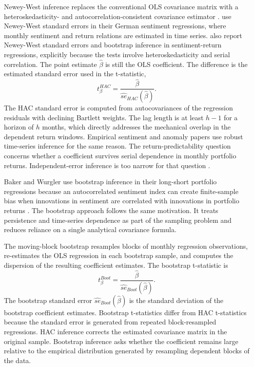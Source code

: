 \documentclass[11pt]{article}
\newcommand{\var}[1]{\ensuremath{#1}}
\begin{document}
Newey-West inference replaces the conventional OLS covariance matrix with a heteroskedasticity- and autocorrelation-consistent covariance estimator \citep{newey1987simple}. \citet{finter2012german} use Newey-West standard errors in their German sentiment regressions, where monthly sentiment and return relations are estimated in time series. \citet{ding2019newtheory} also report Newey-West standard errors and bootstrap inference in sentiment-return regressions, explicitly because the tests involve heteroskedasticity and serial correlation. The point estimate \var{\hat{\beta}} is still the OLS coefficient. The difference is the estimated standard error used in the t-statistic,
\begin{equation}
    t^{HAC}_{\beta}
    =
    \frac{\hat{\beta}}{\widehat{se}_{HAC}(\hat{\beta})}.
\end{equation}
The HAC standard error is computed from autocovariances of the regression residuals with declining Bartlett weights. The lag length is at least \var{h-1} for a horizon of \var{h} months, which directly addresses the mechanical overlap in the dependent return windows. Empirical sentiment and anomaly papers use robust time-series inference for the same reason. The return-predictability question concerns whether a coefficient survives serial dependence in monthly portfolio returns. Independent-error inference is too narrow for that question \citep{stambaugh2012short}.

Baker and Wurgler use bootstrap inference in their long-short portfolio regressions because an autocorrelated sentiment index can create finite-sample bias when innovations in sentiment are correlated with innovations in portfolio returns \citep{baker2006sentiment}. The bootstrap approach follows the same motivation. It treats persistence and time-series dependence as part of the sampling problem and reduces reliance on a single analytical covariance formula.

The moving-block bootstrap resamples blocks of monthly regression observations, re-estimates the OLS regression in each bootstrap sample, and computes the dispersion of the resulting coefficient estimates. The bootstrap t-statistic is
\begin{equation}
    t^{Boot}_{\beta}
    =
    \frac{\hat{\beta}}{\widehat{se}_{Boot}(\hat{\beta})}.
\end{equation}
The bootstrap standard error \var{\widehat{se}_{Boot}(\hat{\beta})} is the standard deviation of the bootstrap coefficient estimates. Bootstrap t-statistics differ from HAC t-statistics because the standard error is generated from repeated block-resampled regressions. HAC inference corrects the estimated covariance matrix in the original sample. Bootstrap inference asks whether the coefficient remains large relative to the empirical distribution generated by resampling dependent blocks of the data.
\end{document}
